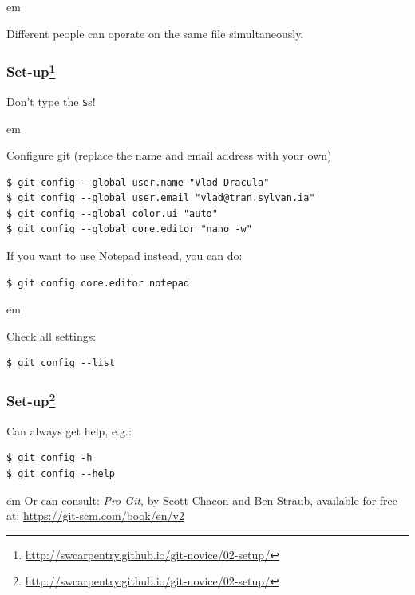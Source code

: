 \documentclass{beamer}
\begin{document}
\begin{frame}
{\begin{minipage}{\textwidth}
\begin{tikzpicture}[y=0.80pt,x=0.80pt,yscale=-1, inner sep=0pt, outer sep=0pt]
  \end{tikzpicture}
\end{minipage}
}
\pause

 em

Different people can operate on the same file simultaneously.

\end{frame}

\begin{frame}[fragile]
\frametitle{Set-up\footnote{\url{http://swcarpentry.github.io/git-novice/02-setup/}}}

\textcolor{red!50!black}{Don't type the \texttt{\$}s!}

 em

Configure git (replace the name and email address with your own)
\begin{verbatim}
$ git config --global user.name "Vlad Dracula"
$ git config --global user.email "vlad@tran.sylvan.ia"
$ git config --global color.ui "auto"
$ git config --global core.editor "nano -w"
\end{verbatim}

If you want to use Notepad instead, you can do:
\begin{verbatim}
$ git config core.editor notepad
\end{verbatim}

\pause

 em

Check all settings:
\begin{verbatim}
$ git config --list
\end{verbatim}

\end{frame}

\begin{frame}[fragile]
\frametitle{Set-up\footnote{\url{http://swcarpentry.github.io/git-novice/02-setup/}}}

Can always get help, e.g.:
\begin{verbatim}
$ git config -h
$ git config --help
\end{verbatim}

 em
Or can consult: \textit{Pro Git}, by Scott Chacon and Ben Straub, available for free at: \url{https://git-scm.com/book/en/v2}

\end{frame}
\end{document}
